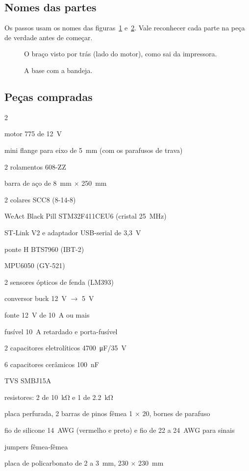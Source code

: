 \documentclass[11pt,a4paper]{article}
\newcommand{\flecha}{\ensuremath{\rightarrow}}
\begin{document}
\subsection{Nomes das partes}

Os passos usam os nomes das figuras~\ref{fig:nomesbraco} e~\ref{fig:nomesbase}. Vale
reconhecer cada parte na peça de verdade antes de começar.

\begin{figure}[H]
  \centering
  \ilNomesBraco
  \caption{O braço visto por trás (lado do motor), como sai da impressora.}
  \label{fig:nomesbraco}
\end{figure}

\begin{figure}[H]
  \centering
  \ilNomesBase
  \caption{A base com a bandeja.}
  \label{fig:nomesbase}
\end{figure}

\subsection{Peças compradas}

\begin{multicols}{2}
\begin{checklist}
  \item motor 775 de 12~V
  \item mini flange para eixo de 5~mm (com os parafusos de trava)
  \item 2 rolamentos 608-ZZ
  \item barra de aço de 8~mm $\times$ 250~mm
  \item 2 colares SCC8 (8-14-8)
  \item WeAct Black Pill STM32F411CEU6 (cristal 25~MHz)
  \item ST-Link V2 e adaptador USB-serial de 3,3~V
  \item ponte H BTS7960 (IBT-2)
  \item MPU6050 (GY-521)
  \item 2 sensores ópticos de fenda (LM393)
  \item conversor buck 12~V \flecha{} 5~V
  \item fonte 12~V de 10~A ou mais
  \item fusível 10~A retardado e porta-fusível
  \item 2 capacitores eletrolíticos \qty{4700}{\micro\farad}/35~V
  \item 6 capacitores cerâmicos \qty{100}{\nano\farad}
  \item TVS SMBJ15A
  \item resistores: 2 de \qty{10}{\kilo\ohm} e 1 de \qty{2,2}{\kilo\ohm}
  \item placa perfurada, 2 barras de pinos fêmea 1 $\times$ 20, bornes de parafuso
  \item fio de silicone 14~AWG (vermelho e preto) e fio de 22 a 24~AWG para sinais
  \item jumpers fêmea-fêmea
  \item placa de policarbonato de 2 a 3~mm, 230 $\times$ 230~mm
\end{checklist}
\end{multicols}
\end{document}
